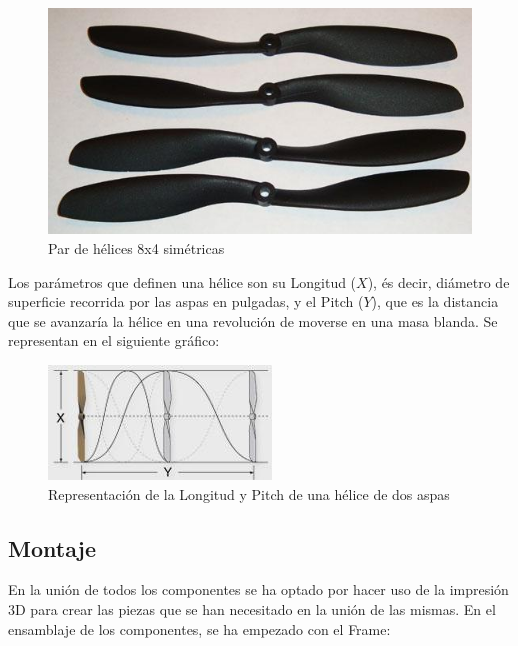 \documentclass[twoside,11pt]{book}
\begin{document}
\begin{figure}[h!]
\begin{center}
\includegraphics[scale=0.65,bb=0 0 450 283]{images/propellers4.png}
\caption{Par de hélices 8x4 simétricas}
\end{center}
\end{figure}


Los parámetros que definen una hélice son su Longitud ($X$), és decir, diámetro de superficie recorrida por las aspas en pulgadas, y el Pitch ($Y$), que es la distancia que se avanzaría la hélice en una revolución de moverse en una masa blanda. Se representan en el siguiente gráfico:

\begin{figure}[h!]
\begin{center}
\includegraphics[scale=0.9,bb=0 0 244 115]{images/propeller_xy.png}
\caption{Representación de la Longitud y Pitch de una hélice de dos aspas}
\end{center}
\end{figure} 

\newpage
\subsection{Montaje}

En la unión de todos los componentes se ha optado por hacer uso de la impresión 3D para crear las piezas que se han necesitado en la unión de las mismas. En el ensamblaje de los componentes, se ha empezado con el Frame: \\
\end{document}
